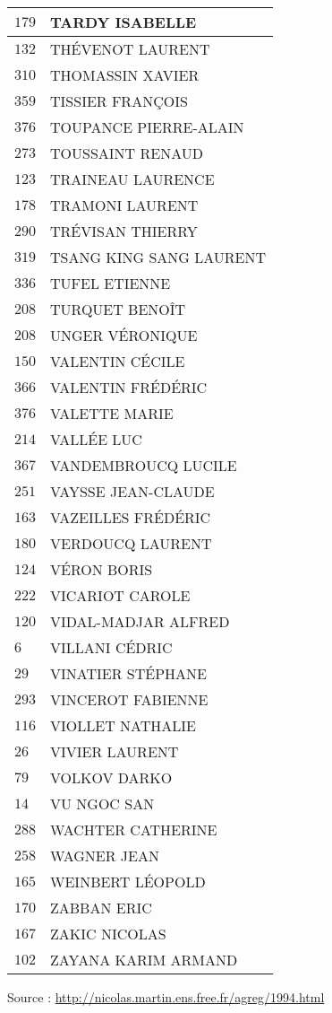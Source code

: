 \begin{xltabular}{\linewidth}{|l|X|}
    \hline
    $179$ & TARDY ISABELLE \\
    \hline
    $132$ & THÉVENOT LAURENT \\
    \hline
    $310$ & THOMASSIN XAVIER \\
    \hline
    $359$ & TISSIER FRANÇOIS \\
    \hline
    $376$ & TOUPANCE PIERRE-ALAIN \\
    \hline
    $273$ & TOUSSAINT RENAUD \\
    \hline
    $123$ & TRAINEAU LAURENCE \\
    \hline
    $178$ & TRAMONI LAURENT \\
    \hline
    $290$ & TRÉVISAN THIERRY \\
    \hline
    $319$ & TSANG KING SANG LAURENT \\
    \hline
    $336$ & TUFEL ETIENNE \\
    \hline
    $208$ & TURQUET BENOÎT \\
    \hline
    $208$ & UNGER VÉRONIQUE \\
    \hline
    $150$ & VALENTIN CÉCILE \\
    \hline
    $366$ & VALENTIN FRÉDÉRIC \\
    \hline
    $376$ & VALETTE MARIE \\
    \hline
    $214$ & VALLÉE LUC \\
    \hline
    $367$ & VANDEMBROUCQ LUCILE \\
    \hline
    $251$ & VAYSSE JEAN-CLAUDE \\
    \hline
    $163$ & VAZEILLES FRÉDÉRIC \\
    \hline
    $180$ & VERDOUCQ LAURENT \\
    \hline
    $124$ & VÉRON BORIS \\
    \hline
    $222$ & VICARIOT CAROLE \\
    \hline
    $120$ & VIDAL-MADJAR ALFRED \\
    \hline
    $6$ & VILLANI CÉDRIC \\
    \hline
    $29$ & VINATIER STÉPHANE \\
    \hline
    $293$ & VINCEROT FABIENNE \\
    \hline
    $116$ & VIOLLET NATHALIE \\
    \hline
    $26$ & VIVIER LAURENT \\
    \hline
    $79$ & VOLKOV DARKO \\
    \hline
    $14$ & VU NGOC SAN \\
    \hline
    $288$ & WACHTER CATHERINE \\
    \hline
    $258$ & WAGNER JEAN \\
    \hline
    $165$ & WEINBERT LÉOPOLD \\
    \hline
    $170$ & ZABBAN ERIC \\
    \hline
    $167$ & ZAKIC NICOLAS \\
    \hline
    $102$ & ZAYANA KARIM ARMAND \\
    \hline
  \end{xltabular}

  \begin{flushright}
    {\tiny Source : \url{http://nicolas.martin.ens.free.fr/agreg/1994.html}}
  \end{flushright}

